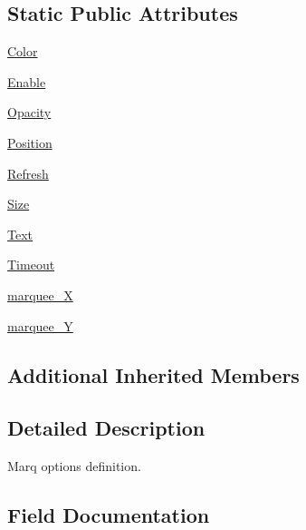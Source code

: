 \subsection*{Static Public Attributes}
\begin{DoxyCompactItemize}
\item 
\hyperlink{classvlc_1_1_video_marquee_option_ab87bacfdad76e61b9412d7124be44c1c}{Color}
\item 
\hyperlink{classvlc_1_1_video_marquee_option_af2ce2eedd3baae85c5ea4b456a737b1b}{Enable}
\item 
\hyperlink{classvlc_1_1_video_marquee_option_a31841bed26ecf2fc5a6253eb838aac4b}{Opacity}
\item 
\hyperlink{classvlc_1_1_video_marquee_option_ab91b34ae619fcdfcba4522b4f335bf83}{Position}
\item 
\hyperlink{classvlc_1_1_video_marquee_option_a97dc5a2e4d5bf168bd74b13f406a1321}{Refresh}
\item 
\hyperlink{classvlc_1_1_video_marquee_option_a1c40db1d9b56c27240e420765695f1c4}{Size}
\item 
\hyperlink{classvlc_1_1_video_marquee_option_ab54cabecd48a4eb41ddb3c17c26eb6fb}{Text}
\item 
\hyperlink{classvlc_1_1_video_marquee_option_ac9bae762fa8503eb566f9f0c1df369d6}{Timeout}
\item 
\hyperlink{classvlc_1_1_video_marquee_option_acf838e458c364f14f578a6b93829de7d}{marquee\+\_\+X}
\item 
\hyperlink{classvlc_1_1_video_marquee_option_ae468db374b5465f00c017594aec42661}{marquee\+\_\+Y}
\end{DoxyCompactItemize}
\subsection*{Additional Inherited Members}


\subsection{Detailed Description}
\begin{DoxyVerb}Marq options definition.
\end{DoxyVerb}
 

\subsection{Field Documentation}
\mbox{\label{classvlc_1_1_video_marquee_option_ab87bacfdad76e61b9412d7124be44c1c}} 
